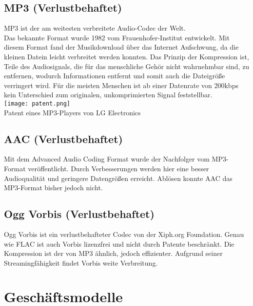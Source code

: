 \documentclass{article}
\begin{document}
	\subsection*{MP3 (Verlustbehaftet)}
	MP3 ist der am weitesten verbreitete Audio-Codec der Welt. \cite{mp3} \\
	Das bekannte Format wurde 1982 vom Frauenhofer-Institut entwickelt. Mit diesem Format fand der Musikdownload über das Internet Aufschwung, da die kleinen Datein leicht verbreitet werden konnten. Das Prinzip der Kompression ist, Teile des Audiosignals, die für das menschliche Gehör nicht wahrnehmbar sind, zu entfernen, wodurch Informationen entfernt und somit auch die Dateigröße verringert wird. Für die meisten Menschen ist ab einer Datenrate von 200kbps kein Unterschied zum originalen, unkomprimierten Signal feststellbar. \cite{mp3aac} \\
	\texttt{[image: patent.png]} \\
	Patent eines MP3-Players von LG Electronics \cite{patent}
	
	\subsection*{AAC (Verlustbehaftet)}
	Mit dem Advanced Audio Coding Format wurde der Nachfolger vom MP3-Format veröffentlicht. Durch Verbesserungen werden hier eine besser Audioqualität und geringere Datengrößen erreicht. Ablösen konnte AAC das MP3-Format bisher jedoch nicht. \cite{mp3aac}
	
	\subsection*{Ogg Vorbis (Verlustbehaftet)}
	Ogg Vorbis ist ein verlustbehafteter Codec von der Xiph.org Foundation. Genau wie FLAC ist auch Vorbis lizenzfrei und nicht durch Patente beschränkt. Die Kompression ist der von MP3 ähnlich, jedoch effizienter. Aufgrund seiner Streamingfähigkeit findet Vorbis weite Verbreitung. \cite{vorbis} \\
	
	\section*{Geschäftsmodelle}
\end{document}
